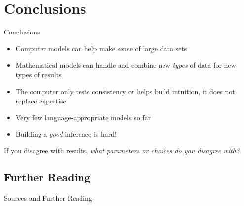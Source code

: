 \documentclass[9pt]{beamer}
\begin{document}
\section{Conclusions}
\begin{frame}{Conclusions}
  \begin{itemize}
  \item Computer models can help make sense of large data sets
  \item Mathematical models can handle and combine new \emph{types} of data for new types of results
  \item The computer only tests consistency or helps build intuition, it does not replace expertise
  \item Very few language-appropriate models so far
  \item Building a \emph{good} inference is hard!
  \end{itemize}
  If you disagree with results, \emph{what parameters or choices do you disagree with?}
\end{frame}
\subsection{Further Reading}
\begin{frame}[t,allowframebreaks]{Sources and Further Reading}
  \nocite{mcmahon2005language,grayatkinson}
  \printbibliography
\end{frame}
\end{document}
